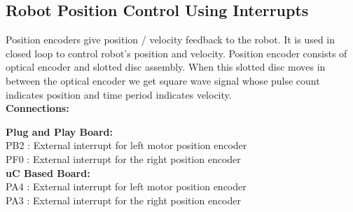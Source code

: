\documentclass[a4paper,10pt,oneside]{article}
\begin{document}
		\subsection{\huge \textbf{Robot Position Control Using Interrupts}}
			{Position encoders give position / velocity feedback to the robot. It is used in closed loop to control robot’s position and velocity.  Position encoder consists of optical  encoder and slotted disc assembly. When this slotted disc moves in between the optical encoder we get square wave signal whose pulse  count  indicates  position  and  time  period indicates  velocity.}\\
			
			\textbf{Connections:\\}
			\begin{center}
				
				\textbf{Plug and Play Board:}\\
				PB2 : External interrupt for left motor position encoder\\
				PF0 : External interrupt for the right position encoder\\
			
				\textbf{uC Based Board:}\\
				PA4 : External interrupt for left motor position encoder\\
				PA3 : External interrupt for the right position encoder\\
			\end{center}
			
\end{document}
